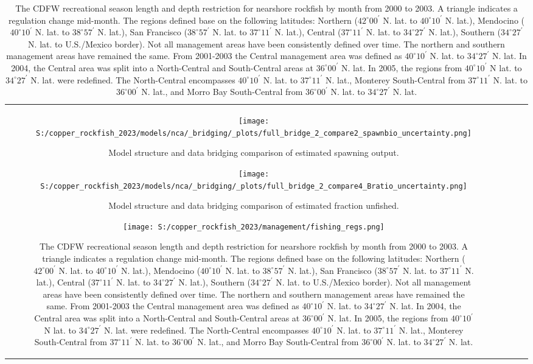 \documentclass[11pt,
  letterpaper,
]{article}
\begin{document}
\begin{longtable}[t]{c>{\centering\arraybackslash}p{2cm}>{\centering\arraybackslash}p{2cm}>{\centering\arraybackslash}p{2cm}}
\pagebreak

\begin{figure}
{\centering
\texttt{[image: S:/copper\_rockfish\_2023/models/nca/\_bridging/\_plots/full\_bridge\_2\_compare2\_spawnbio\_uncertainty.png]}
}
\caption{Model structure and data bridging comparison of estimated spawning output.\label{fig:data-bridge-ssb-2}}
\end{figure}

\pagebreak

\begin{figure}
{\centering
\texttt{[image: S:/copper\_rockfish\_2023/models/nca/\_bridging/\_plots/full\_bridge\_2\_compare4\_Bratio\_uncertainty.png]}
}
\caption{Model structure and data bridging comparison of estimated fraction unfished.\label{fig:data-bridge-depl-2}}
\end{figure}

\pagebreak

\begin{figure}
{\centering
\texttt{[image: S:/copper\_rockfish\_2023/management/fishing\_regs.png]}
}
\caption{The CDFW recreational season length and depth restriction for nearshore rockfish by month from 2000 to 2003. A triangle indicates a regulation change mid-month. The regions defined base on the following latitudes: Northern ($42^\circ 00^\prime$ N. lat. to $40^\circ 10^\prime$ N. lat.), Mendocino ($40^\circ 10^\prime$ N. lat. to $38^\circ 57^\prime$ N. lat.), San Francisco ($38^\circ 57^\prime$ N. lat. to $37^\circ 11^\prime$ N. lat.), Central ($37^\circ 11^\prime$ N. lat. to $34^\circ 27^\prime$ N. lat.), Southern ($34^\circ 27^\prime$ N. lat. to U.S./Mexico border). Not all management areas have been consistently defined over time. The northern  and southern management areas have remained the same. From 2001-2003 the Central management area was defined as $40^\circ 10^\prime$ N. lat. to  $34^\circ 27^\prime$ N. lat. In 2004, the Central area was split into a North-Central and South-Central areas at $36^\circ 00^\prime$ N. lat. In 2005, the regions from $40^\circ 10^\prime$ N lat. to $34^\circ 27^\prime$ N. lat. were redefined. The North-Central encompasses $40^\circ 10^\prime$ N. lat. to $37^\circ 11^\prime$ N. lat., Monterey South-Central from $37^\circ 11^\prime$ N. lat. to $36^\circ 00^\prime$ N. lat., and Morro Bay South-Central from $36^\circ 00^\prime$ N. lat. to $34^\circ 27^\prime$ N. lat.\label{fig:depth-closures}}
\end{figure}


\end{longtable}
\end{document}
